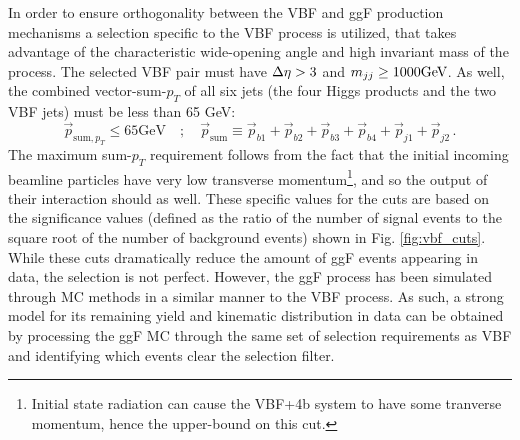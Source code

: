         In order to ensure orthogonality between the VBF and ggF production mechanisms
            a selection specific to the VBF process is utilized,
            that takes advantage of the characteristic wide-opening angle and high invariant mass of the process.
        The selected VBF pair must have $\Delta \eta > 3$ and $m_{jj} \geq 1000 \textrm{GeV}$.
        As well, the combined vector-sum-$p_T$ of all six jets
            (the four Higgs products and the two VBF jets)
            must be less than 65 GeV:
        \begin{equation}
            \vec{p}_{\textrm{sum}, p_T} \leq 65 \textrm{GeV} \quad;\quad
            \vec{p}_{\textrm{sum}} \equiv
            \vec{p}_{b1} + \vec{p}_{b2} + 
            \vec{p}_{b3} + \vec{p}_{b4} +
            \vec{p}_{j1} + \vec{p}_{j2} 
            \,.
        \end{equation}
        The maximum sum-$p_T$ requirement follows from the fact that the initial incoming beamline particles have
            very low transverse momentum\footnote{
                Initial state radiation can cause the VBF+4b system to have some tranverse momentum,
                    hence the upper-bound on this cut.
            }, and so the output of their interaction should as well.
        These specific values for the cuts are based on the significance values
            (defined as the ratio of the number of signal events to the square root of the number of background events)
            shown in Fig. \ref{fig:vbf_cuts}.
        While these cuts dramatically reduce the amount of ggF events appearing in data,
            the selection is not perfect.
        However, the ggF process has been simulated through MC methods in a similar manner to the VBF process.
        As such, a strong model for its remaining yield and kinematic distribution in data can be obtained by processing 
            the ggF MC through the same set of selection requirements as VBF and identifying which events clear the selection filter.


